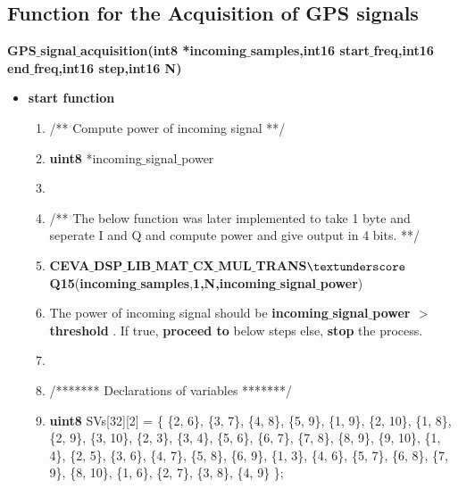 \documentclass[journal,10pt,onecolumn]{article}
\begin{document}
\subsection*{Function for the Acquisition of GPS signals}

\textbf{GPS$\_$signal$\_$acquisition(int8 *incoming$\_$samples,int16 start$\_$freq,int16 end$\_$freq,int16 step,int16 N)}
\begin{itemize}
\item[] \textbf{start function}
\begin{enumerate}
    \item[] /** Compute power of incoming signal **/
    \item[] \textbf{uint8} *incoming$\_$signal$\_$power
    \item[]
    \item[] /** The below function was later implemented to take 1 byte and seperate I and Q and compute power and give output in 4 bits. **/
    \item[] \textbf{CEVA$\_$DSP$\_$LIB$\_$MAT$\_$CX$\_$MUL$\_$TRANS$\textunderscore$Q15}(\textbf{incoming$\_$samples},\textbf{1,N,incoming$\_$signal$\_$power}) 
    \item[]  The power of incoming signal should be \textbf{ incoming$\_$signal$\_$power $>$ threshold} . If true, \textbf{proceed to} below steps else, \textbf{stop} the process.
    \item[]
    \item[] /******* Declarations of variables *******/
    \item[] \textbf{uint8} SVs[32][2] = \{
        \{2, 6\},
        \{3, 7\},
        \{4, 8\},
        \{5, 9\},
        \{1, 9\},
        \{2, 10\},
        \{1, 8\},
        \{2, 9\},
        \{3, 10\},
        \{2, 3\},
        \{3, 4\},
        \{5, 6\},
        \{6, 7\},
        \{7, 8\},
        \{8, 9\},
        \{9, 10\},
        \{1, 4\},
        \{2, 5\},
        \{3, 6\},
        \{4, 7\},
        \{5, 8\}, 
        \{6, 9\},
        \{1, 3\},
        \{4, 6\},
        \{5, 7\}, 
        \{6, 8\},
        \{7, 9\},
        \{8, 10\},
        \{1, 6\},
        \{2, 7\},
        \{3, 8\},
        \{4, 9\}
    \};
     

\end{enumerate}
\end{itemize}
\end{document}
